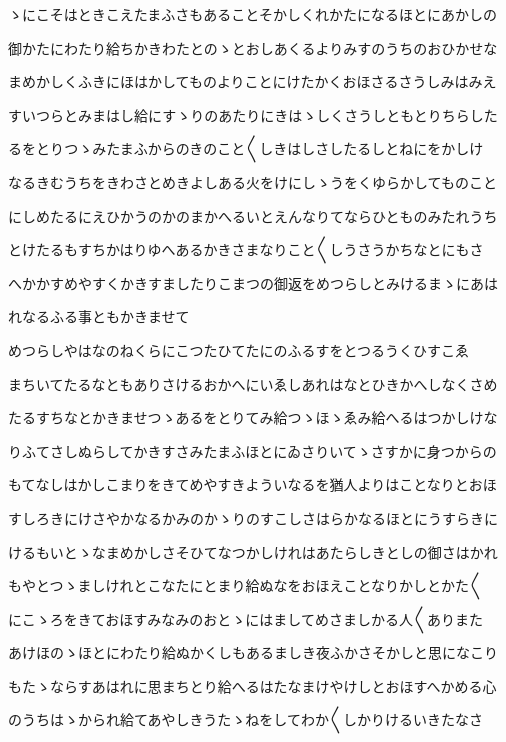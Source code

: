 \documentclass[a4paper,11pt,landscape]{ltjtarticle}
\begin{document}
ゝにこそはときこえたまふさもあることそかしくれかたになるほとにあかしの
\par\medskip
御かたにわたり給ちかきわたとのゝとおしあくるよりみすのうちのおひかせな
\par\medskip
まめかしくふきにほはかしてものよりことにけたかくおほさるさうしみはみえ
\par\medskip
すいつらとみまはし給にすゝりのあたりにきはゝしくさうしともとりちらした
\par\medskip
るをとりつゝみたまふからのきのこと〱しきはしさしたるしとねにをかしけ
\par\medskip
なるきむうちをきわさとめきよしある火をけにしゝうをくゆらかしてものこと
\par\medskip
にしめたるにえひかうのかのまかへるいとえんなりてならひとものみたれうち
\par\medskip
とけたるもすちかはりゆへあるかきさまなりこと〱しうさうかちなとにもさ
\par\medskip
へかかすめやすくかきすましたりこまつの御返をめつらしとみけるまゝにあは
\par\medskip
れなるふる事ともかきませて
\par\medskip
めつらしやはなのねくらにこつたひてたにのふるすをとつるうくひすこゑ
\par\medskip
まちいてたるなともありさけるおかへにいゑしあれはなとひきかへしなくさめ
\par\medskip
たるすちなとかきませつゝあるをとりてみ給つゝほゝゑみ給へるはつかしけな
\par\medskip
りふてさしぬらしてかきすさみたまふほとにゐさりいてゝさすかに身つからの
\par\medskip
もてなしはかしこまりをきてめやすきよういなるを猶人よりはことなりとおほ
\par\medskip
すしろきにけさやかなるかみのかゝりのすこしさはらかなるほとにうすらきに
\par\medskip
けるもいとゝなまめかしさそひてなつかしけれはあたらしきとしの御さはかれ
\par\medskip
もやとつゝましけれとこなたにとまり給ぬなをおほえことなりかしとかた〱
\par\medskip
にこゝろをきておほすみなみのおとゝにはましてめさましかる人〱ありまた
\par\medskip
あけほのゝほとにわたり給ぬかくしもあるましき夜ふかさそかしと思になこり
\par\medskip
もたゝならすあはれに思まちとり給へるはたなまけやけしとおほすへかめる心
\par\medskip
のうちはゝかられ給てあやしきうたゝねをしてわか〱しかりけるいきたなさ
\end{document}
